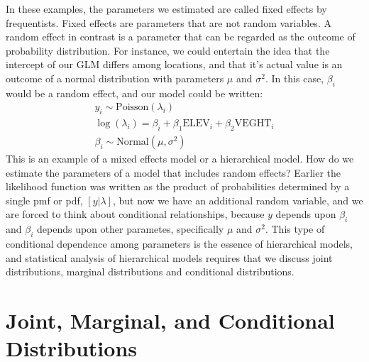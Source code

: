 In these examples, the parameters we estimated are called fixed
effects by frequentists. Fixed effects are parameters that are not
random variables.
A random effect in
contrast is a parameter that can be regarded as the outcome of
probability distribution. For instance,
we could entertain the idea that the intercept of our GLM differs
among locations, and that it's actual value is an outcome of a normal
distribution with parameters $\mu$ and $\sigma^2$. In this case,
$\beta_i$ would be a random effect, and our model could be written:
\begin{gather*}
y_i \sim \text{Poisson}(\lambda_i) \\
\log(\lambda_i) = \beta_i + \beta_1\text{ELEV}_i + \beta_2\text{VEGHT}_i \\
\beta_i \sim \text{Normal}(\mu, \sigma^2)
\end{gather*}
This is an example of a mixed effects model or a hierarchical
model. How do we estimate the parameters of a model that includes
random effects? Earlier the likelihood function was written as the
product of probabilities determined by a single pmf or pdf,
$[y|\lambda]$, but now we have an additional random variable, and we
are forced to think about conditional relationships, because $y$
depends upon $\beta_i$ and $\beta_i$ depends upon other parametes,
specifically $\mu$ and $\sigma^2$.
This type of conditional dependence among parameters is the essence of hierarchical
models, and statistical analysis of hierarchical models requires that
we discuss joint distributions, marginal distributions and conditional
distributions.






\section{Joint, Marginal, and Conditional Distributions}

